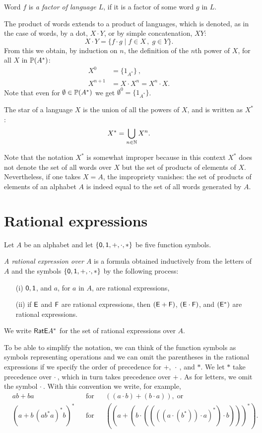 Word $f$ is \emph{a factor of language $L$}, if it is a factor of some word $g$ in $L$.

The product of words extends to a product of languages, which is denoted, as in the case of words, by a dot, $X \cdot Y$, or by simple concatenation, $X Y$:
\[
    X \cdot Y = \{ f \cdot g \mid f \in X \, , \; g \in Y \}.
\]
From this we obtain, by induction on $n$, the definition of the $n$th power of $X$, for all $X$ in $\mathbb{P}(A^*)$:
\begin{align*}
    X^0 &= \{1_{A^*}\} \: ,\\
    X^{n+1} &= X \cdot X^n = X^n \cdot X.
\end{align*}
Note that even for $\emptyset \in \mathbb{P}(A^*)$ we get $\emptyset^0 = \{1_{A^*}\}$.

The star of a language $X$ is the union of all the powers of $X$, and is written as $X^*$:
\[
    X^* = \bigcup_{n \in \mathbb{N}} X^n.
\]

Note that the notation $X^*$ is somewhat improper because in this context $X^*$ does not denote the set of all words over $X$ but the set of products of elements of $X$. Nevertheless, if one takes $X = A$, the impropriety vanishes: the set of products of elements of an alphabet $A$ is indeed equal to the set of all words generated by $A$.

\section{Rational expressions}

Let $A$ be an alphabet and let $\{{\mathsf{0}}, {\mathsf{1}}, +, \cdot, *\}$ be five function symbols.

\begin{defn}
    \emph{A rational expression over $A$} is a formula obtained inductively from the letters of $A$ and the symbols $\{{\mathsf{0}}, {\mathsf{1}}, +, \cdot, *\}$ by the following process:
    \begin{itemize}
        \item[(i)] ${\mathsf{0}}, {\mathsf{1}}$, and $a$, for $a$ in $A$, are rational expressions,
        \item[(ii)] if ${\mathsf{E}}$ and ${\mathsf{F}}$ are rational expressions, then $({\mathsf{E}} + {\mathsf{F}})$, $({\mathsf{E}} \cdot {\mathsf{F}})$, and $({\mathsf{E}}^*)$ are rational expressions.
    \end{itemize}
    We write ${\mathsf{RatE}} A^*$ for the set of rational expressions over $A$.
\end{defn}

To be able to simplify the notation, we can think of the function symbols as symbols representing operations and we can omit the parentheses in the rational expressions if we specify the order of precedence for $+, \: \cdot \:$, and $*$. We let $*$ take precedence over $\cdot \:$, which in turn takes precedence over $+ \:$. As for letters, we omit the symbol $\cdot \:$. With this convention we write, for example,
\begin{align*}
    &ab + ba & &\text{for} & &((a \cdot b) + (b \cdot a)), \; \text{or}\\
    &{(a + b \, {(a b^* a)}^* b)}^* & &\text{for} & &({(a + (b \cdot (({((a \cdot (b^*)) \cdot a)}^* ) \cdot b)))}^* ) .
\end{align*}

